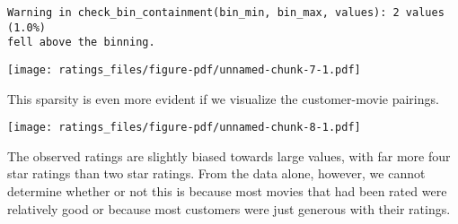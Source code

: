 \documentclass[
  letterpaper,
  DIV=11,
  numbers=noendperiod]{scrartcl}
\newenvironment{Shaded}{\begin{snugshade}}{\end{snugshade}}
\newcommand{\AttributeTok}[1]{\textcolor[rgb]{0.40,0.45,0.13}{#1}}
\newcommand{\ControlFlowTok}[1]{\textcolor[rgb]{0.00,0.23,0.31}{#1}}
\newcommand{\DecValTok}[1]{\textcolor[rgb]{0.68,0.00,0.00}{#1}}
\newcommand{\FunctionTok}[1]{\textcolor[rgb]{0.28,0.35,0.67}{#1}}
\newcommand{\NormalTok}[1]{\textcolor[rgb]{0.00,0.23,0.31}{#1}}
\newcommand{\OtherTok}[1]{\textcolor[rgb]{0.00,0.23,0.31}{#1}}
\newcommand{\SpecialCharTok}[1]{\textcolor[rgb]{0.37,0.37,0.37}{#1}}
\newcommand{\StringTok}[1]{\textcolor[rgb]{0.13,0.47,0.30}{#1}}
\begin{document}
\begin{verbatim}
Warning in check_bin_containment(bin_min, bin_max, values): 2 values (1.0%)
fell above the binning.
\end{verbatim}

\texttt{[image: ratings\_files/figure-pdf/unnamed-chunk-7-1.pdf]}

This sparsity is even more evident if we visualize the customer-movie
pairings.

\begin{Shaded}
\end{Shaded}

\texttt{[image: ratings\_files/figure-pdf/unnamed-chunk-8-1.pdf]}

The observed ratings are slightly biased towards large values, with far
more four star ratings than two star ratings. From the data alone,
however, we cannot determine whether or not this is because most movies
that had been rated were relatively good or because most customers were
just generous with their ratings.
\end{document}
